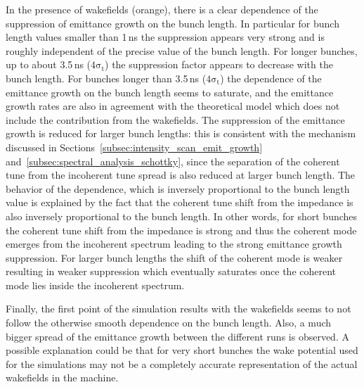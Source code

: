  In the presence of wakefields (orange), there is a clear dependence of the suppression of emittance growth on the bunch length. In particular for bunch length values smaller than 1\,ns the suppression appears very strong and is roughly independent of the precise value of the bunch length. For longer bunches, up to about 3.5\,ns ($\mathrm{4 \sigma_t}$) the suppression factor appears to decrease with the bunch length. For bunches longer than 3.5\,ns ($\mathrm{4 \sigma_t}$) the dependence of the emittance growth on the bunch length seems to saturate, and the emittance growth rates are also in agreement with the theoretical model which does not include the contribution from the wakefields. The suppression of the emittance growth is reduced for larger bunch lengths: this is consistent with the mechanism discussed in Sections~\ref{subsec:intensity_scan_emit_growth} and~\ref{subsec:spectral_analysis_schottky}, since the separation of the coherent tune from the incoherent tune spread is also reduced at larger bunch length. The behavior of the dependence, which is inversely proportional to the bunch length value is explained by the fact that the coherent tune shift from the impedance is also inversely proportional to the bunch length. In other words, for short bunches the coherent tune shift from the impedance is strong and thus the coherent mode emerges from the incoherent spectrum leading to the strong emittance growth suppression. For larger bunch lengths the shift of the coherent mode is weaker resulting in weaker suppression which eventually saturates once the coherent mode lies inside the incoherent spectrum.

 Finally, the first point of the simulation results with the wakefields seems to not follow the otherwise smooth dependence on the bunch length. Also, a much bigger spread of the emittance growth between the different runs is observed. A possible explanation could be that for very short bunches the wake potential used for the simulations may not be a completely accurate representation of the actual wakefields in the machine. %




